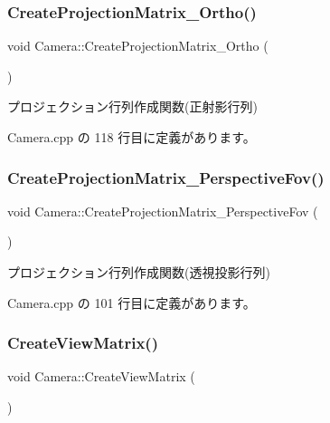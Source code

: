 \subsubsection{\texorpdfstring{Create\+Projection\+Matrix\+\_\+\+Ortho()}{CreateProjectionMatrix\_Ortho()}}
{\footnotesize\ttfamily void Camera\+::\+Create\+Projection\+Matrix\+\_\+\+Ortho (\begin{DoxyParamCaption}{ }\end{DoxyParamCaption})}



プロジェクション行列作成関数(正射影行列) 



 Camera.\+cpp の 118 行目に定義があります。

\mbox{\label{class_camera_a1786fe1adbe95e2ffa2de4cdb114546a}} 
\subsubsection{\texorpdfstring{Create\+Projection\+Matrix\+\_\+\+Perspective\+Fov()}{CreateProjectionMatrix\_PerspectiveFov()}}
{\footnotesize\ttfamily void Camera\+::\+Create\+Projection\+Matrix\+\_\+\+Perspective\+Fov (\begin{DoxyParamCaption}{ }\end{DoxyParamCaption})}



プロジェクション行列作成関数(透視投影行列) 



 Camera.\+cpp の 101 行目に定義があります。

\mbox{\label{class_camera_a5b4993ffb218536cb31d6d5224453b1a}} 
\subsubsection{\texorpdfstring{Create\+View\+Matrix()}{CreateViewMatrix()}}
{\footnotesize\ttfamily void Camera\+::\+Create\+View\+Matrix (\begin{DoxyParamCaption}{ }\end{DoxyParamCaption})}



